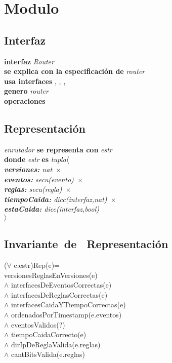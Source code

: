 \section*{Modulo }

\vspace{22pt}

\subsection*{Interfaz}
\hspace{-0.75cm}
\textbf{interfaz} \textit{Router}\\
\textbf{se explica con la especificaci\'on de} \textit{router}\\
\textbf{usa interfaces} , , 		, \\
\textbf{genero} \textit{router}\\
\textbf{operaciones}


\subsection*{Representaci\'on}
\hspace{-0.75cm}
\textit{enrutador} \textbf{se representa con} \textit{estr}\\
\textbf{donde} \textit{estr} \textbf{es} \textit{tupla$ \\ \langle$\ \\ \textbf{versiones:} nat\ 	$\times$\  \\ \textbf{eventos:} secu(evento)\ $\times$\ \\ \textbf{reglas:} secu(regla)\ $\times$\ \\ \textbf{tiempoCaida:} dicc(interfaz,nat)\ $\times$\ \\ \textbf{estaCaida:} dicc(interfaz,bool) \\ $\rangle$}


\subsection*{Invariante\ de \ Representaci\'on}

\textbf{} 
\hspace{-0.75cm}($\forall$ e:estr)Rep(e)=\\
versionesReglasEnVersiones(e)\\
$\wedge$ interfacesDeEventosCorrectas(e)\\
$\wedge$ interfacesDeReglasCorrectas(e)\\
$\wedge$ interfacesCaidaYTiempoCorrectas(e) \\
$\wedge$ ordenadosPorTimestamp(e.eventos)\\
$\wedge$ eventosValidos(?)\\
$\wedge$ tiempoCaidaCorrecto(e)  \\
$\wedge$ dirIpDeReglaValida(e.reglas)\\
$\wedge$ cantBitsValida(e.reglas)\\

